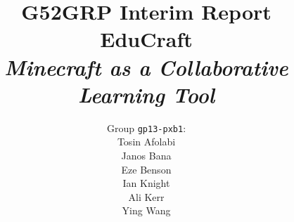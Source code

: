 \documentclass[11pt,a4paper]{report}
\begin{document}
\title{{\normalsize G52GRP Interim Report}\\EduCraft\\\textit{Minecraft as a Collaborative Learning Tool}}
\author{Group \texttt{gp13-pxb1}:\\
            Tosin Afolabi\\
            Janos Bana\\
            Eze Benson\\
            Ian Knight\\
            Ali Kerr\\
            Ying Wang
            }
\maketitle










\end{document}
